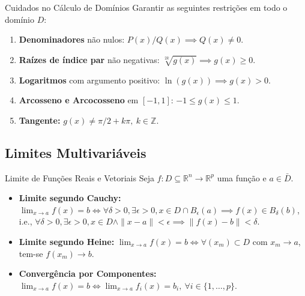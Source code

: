 \documentclass[11pt,a4paper]{article}
\newcommand{\R}{\mathbb{R}}
\newcommand{\Z}{\mathbb{Z}}
\begin{document}
\vspace{0.5cm}

\noindent\begin{theorembox}{Cuidados no Cálculo de Domínios}
  Garantir as seguintes restrições em todo o domínio $D$:
  \begin{enumerate}
    \item \textbf{Denominadores} não nulos: $P(x)/Q(x) \implies Q(x) \neq 0$.
    \item \textbf{Raízes de índice par} não negativas: $\sqrt[2k]{g(x)} \implies g(x) \geq 0$.
    \item \textbf{Logaritmos} com argumento positivo: $\ln(g(x)) \implies g(x) > 0$.
    \item \textbf{Arcosseno e Arcocosseno} em $[-1, 1]$: $-1 \leq g(x) \leq 1$.
    \item \textbf{Tangente:} $g(x) \neq \pi/2 + k\pi, \ k \in \Z$.
  \end{enumerate}
\end{theorembox}

\subsection{Limites Multivariáveis}

\noindent\begin{definitionbox}{Limite de Funções Reais e Vetoriais}
  Seja $f : D \subseteq \R^n \to \R^p$ uma função e $a \in \bar{D}$.
  \begin{itemize}
    \item \textbf{Limite segundo Cauchy:} $\lim_{x \to a} f(x) = b \iff \forall \delta > 0, \exists \epsilon > 0, x \in D \cap B_\epsilon(a) \implies f(x) \in B_\delta(b)$, i.e., $\forall \delta > 0, \exists \epsilon > 0, x \in D \wedge \|x - a\| < \epsilon \implies \|f(x) - b\| < \delta$.
    \item \textbf{Limite segundo Heine:} $\lim_{x\to a} f(x) = b \iff \forall (x_m) \subset D$ com $x_m \to a$, tem-se $f(x_m) \to b$.
    \item \textbf{Convergência por Componentes:} $\lim_{x \to a} f(x) = b \iff \lim_{x \to a} f_i(x) = b_i, \ \forall i \in \{1, \dots, p\}$.
  \end{itemize}
\end{definitionbox}
\end{document}
